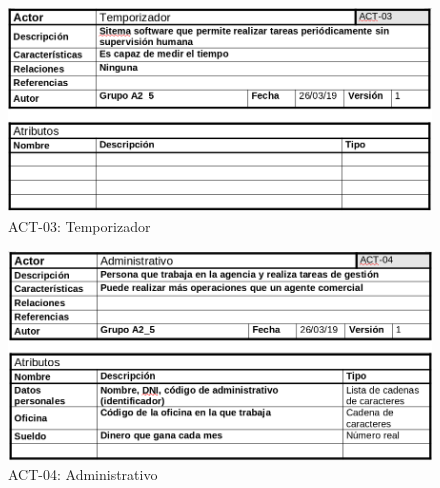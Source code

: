\documentclass{article}
\begin{document}
	\begin{figure}[H]
		\centering
		\includegraphics[totalheight=6.5cm]{act-3}
		\caption{ACT-03: Temporizador}
		\label{fig:act-3}
	\end{figure}

	\begin{figure}[H]
		\centering
		\includegraphics[totalheight=7cm]{act-4}
		\caption{ACT-04: Administrativo}
		\label{fig:act-4}
	\end{figure}
\end{document}
